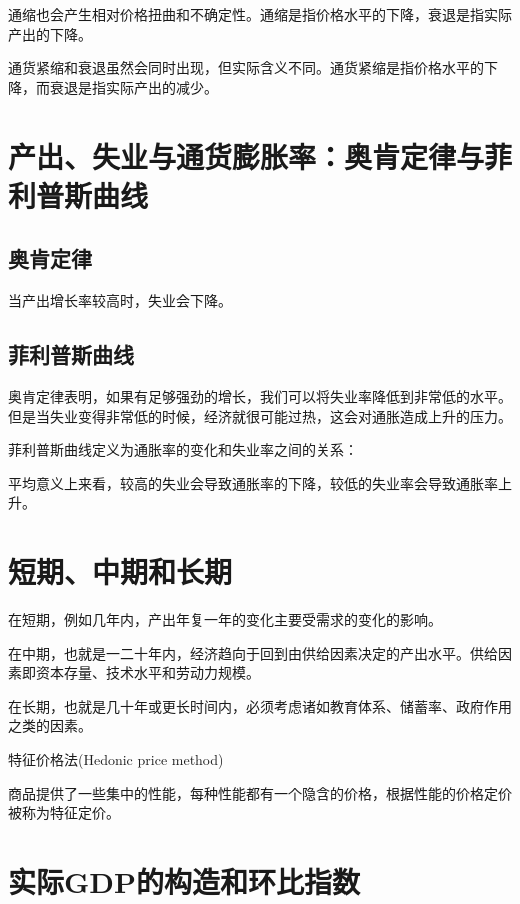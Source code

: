 \documentclass{article}
\begin{document}
\hspace*{\fill}

通缩也会产生相对价格扭曲和不确定性。通缩是指价格水平的下降，衰退是指实际产出的下降。

通货紧缩和衰退虽然会同时出现，但实际含义不同。通货紧缩是指价格水平的下降，而衰退是指实际产出的减少。


\section{产出、失业与通货膨胀率：奥肯定律与菲利普斯曲线}
\subsection{奥肯定律}
当产出增长率较高时，失业会下降。 

\subsection{菲利普斯曲线}
奥肯定律表明，如果有足够强劲的增长，我们可以将失业率降低到非常低的水平。但是当失业变得非常低的时候，经济就很可能过热，这会对通胀造成上升的压力。

菲利普斯曲线定义为通胀率的变化和失业率之间的关系：

平均意义上来看，较高的失业会导致通胀率的下降，较低的失业率会导致通胀率上升。

\section{短期、中期和长期}
在短期，例如几年内，产出年复一年的变化主要受需求的变化的影响。

在中期，也就是一二十年内，经济趋向于回到由供给因素决定的产出水平。供给因素即资本存量、技术水平和劳动力规模。

在长期，也就是几十年或更长时间内，必须考虑诸如教育体系、储蓄率、政府作用之类的因素。

\hspace*{\fill}

特征价格法(Hedonic price method)

商品提供了一些集中的性能，每种性能都有一个隐含的价格，根据性能的价格定价被称为特征定价。


\section{实际GDP的构造和环比指数}
\end{document}
